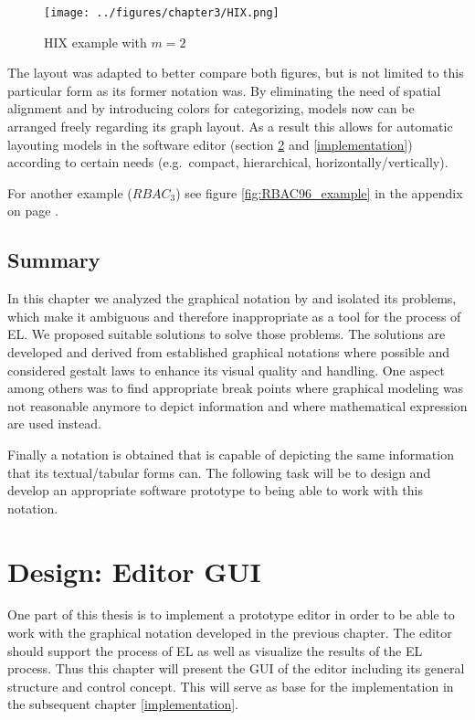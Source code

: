 \documentclass[twoside, openright, 12pt]{book}
\begin{document}
\begin{figure}[htb]
	\centering
	\texttt{[image: ../figures/chapter3/HIX.png]}
	\caption{HIX example with $m=2$ \citep{Amthor18}}
	\label{fig:HIX}
\end{figure}

\noindent
The layout was adapted to better compare both figures, but is not limited to this particular form as its former notation was.
By eliminating the need of spatial alignment and by introducing colors for categorizing, models now can be arranged freely regarding its graph layout.
As a result this allows for automatic layouting models in the software editor (section \ref{editor_design} and \ref{implementation}) according to certain needs (e.g.~compact, hierarchical, horizontally/vertically).

For another example ($RBAC_3$) see figure \ref{fig:RBAC96_example} in the appendix on page \pageref{fig:RBAC96_example}.




\section{Summary}
\label{gsl_summary}
In this chapter we analyzed the graphical notation by \cite{Amthor18} and isolated its problems, which make it ambiguous and therefore inappropriate as a tool for the process of EL.
We proposed suitable solutions to solve those problems.
The solutions are developed and derived from established graphical notations where possible and considered gestalt laws to enhance its visual quality and handling.
One aspect among others was to find appropriate break points where graphical modeling was not reasonable anymore to depict information and where mathematical expression are used instead.

Finally a notation is obtained that is capable of depicting the same information that its textual/tabular forms can.
The following task will be to design and develop an appropriate software prototype to being able to work with this notation.





\cleardoublepage
\chapter{Design: Editor GUI}
\label{editor_design}
One part of this thesis is to implement a prototype editor in order to be able to work with the graphical notation developed in the previous chapter.
The editor should support the process of EL as well as visualize the results of the EL process.
Thus this chapter will present the GUI of the editor including its general structure and control concept.
This will serve as base for the implementation in the subsequent chapter \ref{implementation}.
\end{document}
